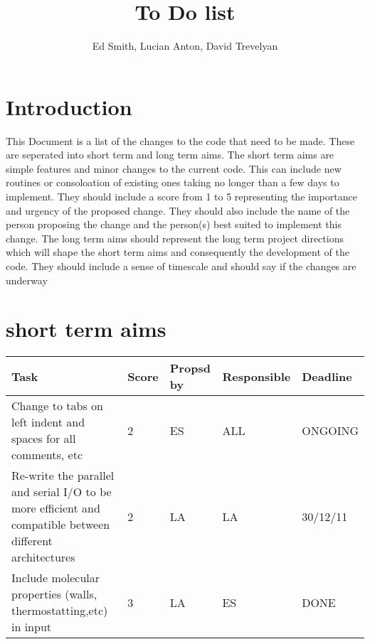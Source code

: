 \documentclass[a4paper,10pt]{article}
\numberwithin{equation}{section}
\numberwithin{figure}{section}
\begin{document}
\title{To Do list}
\author{Ed Smith, Lucian Anton, David Trevelyan}

\maketitle

\section{Introduction}

This Document is a list of the changes to the code that need to be made.
These are seperated into short term and long term aims. The short
term aims are simple features and minor changes to the current code. This can include
new routines or consoloation of existing ones taking no longer than a few days to implement.
They should include a score from 1 to 5 representing the importance and urgency of the proposed 
change. They should also include the name of the person proposing the change and the
person(s) best suited to implement this change.
The long term aims should represent the long term project directions which will
shape the short term aims and consequently the development of the code. 
They should include a sense of timescale and should say if the changes are underway

\section{short term aims}

\begin{tabular}{|p{8cm}|l|l|l|l|}  \hline
Task & Score & Propsd by & Responsible & Deadline \\ \hline
Change to tabs on left indent and spaces for all comments, etc & 2 & ES & ALL  & ONGOING \\ \hline
Re-write the parallel and serial I/O to be more efficient and compatible between different architectures & 2 & LA & LA & 30/12/11 \\ \hline
Include molecular properties (walls, thermostatting,etc) in input & 3 & LA & ES & DONE \\ \hline

\end{tabular}
\end{document}
